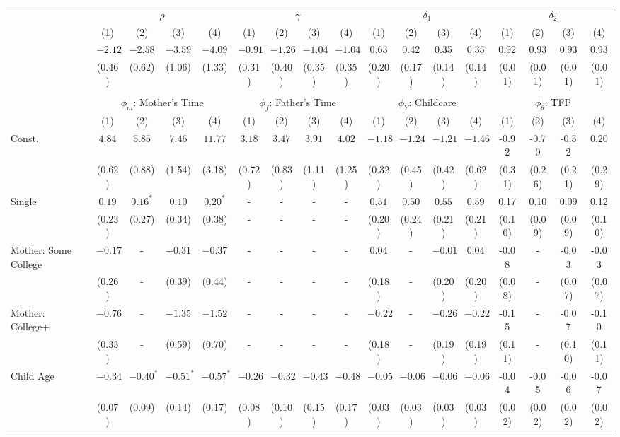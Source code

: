 \begin{tabular}{lcccccccccccccccc}\\\toprule
 & \multicolumn{4}{c}{$\rho$} & \multicolumn{4}{c}{$\gamma$} & \multicolumn{4}{c}{$\delta_{1}$} & \multicolumn{4}{c}{$\delta_{2}$} \\
&(1)&(2)&(3)&(4)&(1)&(2)&(3)&(4)&(1)&(2)&(3)&(4)&(1)&(2)&(3)&(4)\\\cmidrule(r){2-5}\cmidrule(r){6-9}\cmidrule(r){10-13}\cmidrule(r){14-17}
&$-2.12$&$-2.58$&$-3.59$&$-4.09$&$-0.91$&$-1.26$&$-1.04$&$-1.04$&0.63&0.42&0.35&0.35&0.92&0.93&0.93&0.93\\
&(0.46)&(0.62)&(1.06)&(1.33)&(0.31)&(0.40)&(0.35)&(0.35)&(0.20)&(0.17)&(0.14)&(0.14)&(0.01)&(0.01)&(0.01)&(0.01)\\
&&&&&&&&&&&&&&&&\\
 & \multicolumn{4}{c}{$\phi_{m}$: Mother's Time} & \multicolumn{4}{c}{$\phi_{f}$: Father's Time} & \multicolumn{4}{c}{$\phi_{Y}$: Childcare} & \multicolumn{4}{c}{$\phi_{\theta}$: TFP} \\
&(1)&(2)&(3)&(4)&(1)&(2)&(3)&(4)&(1)&(2)&(3)&(4)&(1)&(2)&(3)&(4)\\\cmidrule(r){2-5}\cmidrule(r){6-9}\cmidrule(r){10-13}\cmidrule(r){14-17}
Const.&$4.84$&$5.85$&$7.46$&$11.77$&$3.18$&$3.47$&$3.91$&$4.02$&$-1.18$&$-1.24$&$-1.21$&$-1.46$&-0.92&-0.70&-0.52&0.20\\
&(0.62)&(0.88)&(1.54)&(3.18)&(0.72)&(0.83)&(1.11)&(1.25)&(0.32)&(0.45)&(0.42)&(0.62)&(0.31)&(0.26)&(0.21)&(0.29)\\
Single&$0.19$&$0.16^{*}$&$0.10$&$0.20^{*}$&-&-&-&-&$0.51$&$0.50$&$0.55$&$0.59$&0.17&0.10&0.09&0.12\\
&(0.23)&(0.27)&(0.34)&(0.38)&-&-&-&-&(0.20)&(0.24)&(0.21)&(0.21)&(0.10)&(0.09)&(0.09)&(0.10)\\
Mother: Some College&$-0.17$&-&$-0.31$&$-0.37$&-&-&-&-&$0.04$&-&$-0.01$&$0.04$&-0.08&-&-0.03&-0.03\\
&(0.26)&-&(0.39)&(0.44)&-&-&-&-&(0.18)&-&(0.20)&(0.20)&(0.08)&-&(0.07)&(0.07)\\
Mother: College+&$-0.76$&-&$-1.35$&$-1.52$&-&-&-&-&$-0.22$&-&$-0.26$&$-0.22$&-0.15&-&-0.07&-0.10\\
&(0.33)&-&(0.59)&(0.70)&-&-&-&-&(0.18)&-&(0.19)&(0.19)&(0.11)&-&(0.10)&(0.11)\\
Child Age&$-0.34$&$-0.40^{*}$&$-0.51^{*}$&$-0.57^{*}$&$-0.26$&$-0.32$&$-0.43$&$-0.48$&$-0.05$&$-0.06$&$-0.06$&$-0.06$&-0.04&-0.05&-0.06&-0.07\\
&(0.07)&(0.09)&(0.14)&(0.17)&(0.08)&(0.10)&(0.15)&(0.17)&(0.03)&(0.03)&(0.03)&(0.03)&(0.02)&(0.02)&(0.02)&(0.02)\\

\end{tabular}

